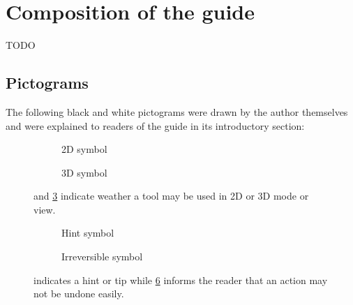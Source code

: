 \section{Composition of the guide}\label{s:guide_comp}
TODO

\subsection{Pictograms}\label{s:mm-pictograms}
The following black and white pictograms were drawn by the author themselves and were explained to readers of the guide in its introductory section:
\newline
\begin{figure}[h!]
	\begin{centering}
		\begin{subfigure}{0.5\textwidth}
			
			\caption{2D symbol}\label{fig:2d_icon}
		\end{subfigure}
		\begin{subfigure}{0.5\textwidth}
			
			\caption{3D symbol}\label{fig:3d_icon}
		\end{subfigure}
	\end{centering}
	\caption{ and \cref{fig:3d_icon} indicate weather a tool may be used in 2D or 3D mode or view.}
\end{figure}

\begin{figure}[h!]
	\begin{centering}
		\begin{subfigure}{0.5\textwidth}
			
			\caption{Hint symbol}\label{fig:hint_icon}
		\end{subfigure}
		\begin{subfigure}{0.5\textwidth}
			
			\caption{Irreversible symbol}\label{fig:noundo_icon}
		\end{subfigure}
	\end{centering}
	\caption{ indicates a hint or tip while \cref{fig:noundo_icon} informs the reader that an action may not be undone easily.}
\end{figure}

